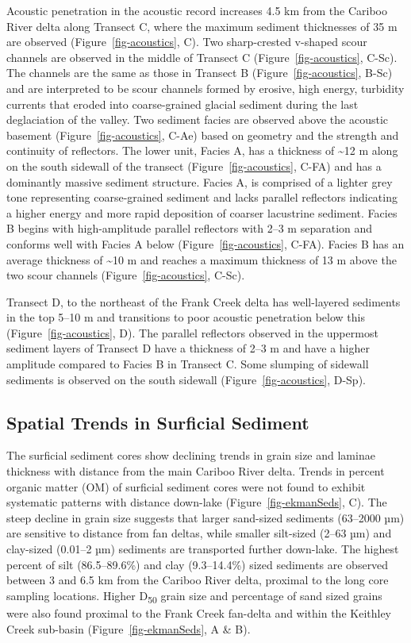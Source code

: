 \documentclass[
  letterpaper,
  DIV=11,
  numbers=noendperiod]{scrartcl}
\begin{document}
Acoustic penetration in the acoustic record increases 4.5 km from the
Cariboo River delta along Transect C, where the maximum sediment
thicknesses of 35 m are observed (Figure~\ref{fig-acoustics}, C). Two
sharp-crested v-shaped scour channels are observed in the middle of
Transect C (Figure~\ref{fig-acoustics}, C-Sc). The channels are the same
as those in Transect B (Figure~\ref{fig-acoustics}, B-Sc) and are
interpreted to be scour channels formed by erosive, high energy,
turbidity currents that eroded into coarse-grained glacial sediment
during the last deglaciation of the valley. Two sediment facies are
observed above the acoustic basement (Figure~\ref{fig-acoustics}, C-Ae)
based on geometry and the strength and continuity of reflectors. The
lower unit, Facies A, has a thickness of \textasciitilde12 m along on
the south sidewall of the transect (Figure~\ref{fig-acoustics}, C-FA)
and has a dominantly massive sediment structure. Facies A, is comprised
of a lighter grey tone representing coarse-grained sediment and lacks
parallel reflectors indicating a higher energy and more rapid deposition
of coarser lacustrine sediment. Facies B begins with high-amplitude
parallel reflectors with 2--3 m separation and conforms well with Facies
A below (Figure~\ref{fig-acoustics}, C-FA). Facies B has an average
thickness of \textasciitilde10 m and reaches a maximum thickness of 13 m
above the two scour channels (Figure~\ref{fig-acoustics}, C-Sc).

Transect D, to the northeast of the Frank Creek delta has well-layered
sediments in the top 5--10 m and transitions to poor acoustic
penetration below this (Figure~\ref{fig-acoustics}, D). The parallel
reflectors observed in the uppermost sediment layers of Transect D have
a thickness of 2--3 m and have a higher amplitude compared to Facies B
in Transect C. Some slumping of sidewall sediments is observed on the
south sidewall (Figure~\ref{fig-acoustics}, D-Sp).

\subsection{Spatial Trends in Surficial Sediment}\label{spatial}

The surficial sediment cores show declining trends in grain size and
laminae thickness with distance from the main Cariboo River delta.
Trends in percent organic matter (OM) of surficial sediment cores were
not found to exhibit systematic patterns with distance down-lake
(Figure~\ref{fig-ekmanSeds}, C). The steep decline in grain size
suggests that larger sand-sized sediments (63--2000 µm) are sensitive to
distance from fan deltas, while smaller silt-sized (2--63 µm) and
clay-sized (0.01--2 µm) sediments are transported further down-lake. The
highest percent of silt (86.5--89.6\%) and clay (9.3--14.4\%) sized
sediments are observed between 3 and 6.5 km from the Cariboo River
delta, proximal to the long core sampling locations. Higher
D\textsubscript{50} grain size and percentage of sand sized grains were
also found proximal to the Frank Creek fan-delta and within the Keithley
Creek sub-basin (Figure~\ref{fig-ekmanSeds}, A \& B).
\end{document}
